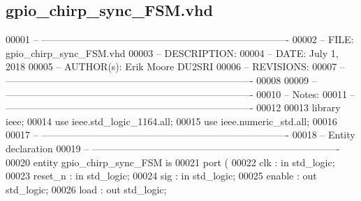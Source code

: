 \subsection{gpio\+\_\+chirp\+\_\+sync\+\_\+\+F\+S\+M.\+vhd}
\label{gpio__chirp__sync__FSM_8vhd_source}

\begin{DoxyCode}
00001 \textcolor{keyword}{-- ---------------------------------------------------------------------------- }
00002 \textcolor{keyword}{-- FILE:    gpio\_chirp\_sync\_FSM.vhd}
00003 \textcolor{keyword}{-- DESCRIPTION:  }
00004 \textcolor{keyword}{-- DATE:    July 1, 2018}
00005 \textcolor{keyword}{-- AUTHOR(s):   Erik Moore DU2SRI}
00006 \textcolor{keyword}{-- REVISIONS:}
00007 \textcolor{keyword}{-- ---------------------------------------------------------------------------- }
00008 
00009 \textcolor{keyword}{-- ----------------------------------------------------------------------------}
00010 \textcolor{keyword}{-- Notes:}
00011 \textcolor{keyword}{-- ----------------------------------------------------------------------------}
00012 
00013 \textcolor{vhdlkeyword}{library }\textcolor{keywordflow}{ieee};
00014 \textcolor{vhdlkeyword}{use }ieee.std\_logic\_1164.\textcolor{keywordflow}{all};
00015 \textcolor{vhdlkeyword}{use }ieee.numeric\_std.\textcolor{keywordflow}{all};
00016 
00017 \textcolor{keyword}{-- ----------------------------------------------------------------------------}
00018 \textcolor{keyword}{-- Entity declaration}
00019 \textcolor{keyword}{-- ----------------------------------------------------------------------------}
00020 \textcolor{keywordflow}{entity }gpio_chirp_sync_FSM \textcolor{keywordflow}{is}
00021    \textcolor{keywordflow}{port} \textcolor{vhdlchar}{(}
00022       \textcolor{vhdlchar}{clk}               \textcolor{vhdlchar}{:} \textcolor{keywordflow}{in} \textcolor{comment}{std\_logic};
00023       \textcolor{vhdlchar}{reset_n}           \textcolor{vhdlchar}{:} \textcolor{keywordflow}{in} \textcolor{comment}{std\_logic};
00024       \textcolor{vhdlchar}{sig}                   \textcolor{vhdlchar}{:} \textcolor{keywordflow}{in} \textcolor{comment}{std\_logic};
00025         enable              : \textcolor{keywordflow}{out} \textcolor{comment}{std\_logic};
00026         \textcolor{vhdlchar}{load}                    \textcolor{vhdlchar}{:} \textcolor{keywordflow}{out} \textcolor{comment}{std\_logic};

\end{DoxyCode}
